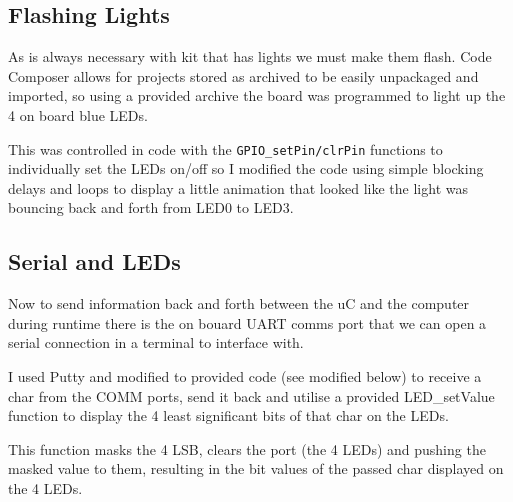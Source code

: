 \documentclass[11pt]{article}
\begin{document}
\begin{preview}
    \subsection{Flashing Lights}
    As is always necessary with kit that has lights we must make them flash. Code Composer allows for projects stored as archived to be easily unpackaged and imported, so using a provided archive the board was programmed to light up the 4 on board blue LEDs.

    This was controlled in code with the \texttt{GPIO\_setPin/clrPin} functions to individually set the LEDs on/off so I modified the code using simple blocking delays and loops to display a little animation that looked like the light was bouncing back and forth from LED0 to LED3. 
        
    \subsection{Serial and LEDs}
    Now to send information back and forth between the uC and the computer during runtime there is the on bouard UART comms port that we can open a serial connection in a terminal to interface with.

    I used Putty and modified to provided code (see modified below) to receive a char from the COMM ports, send it back and utilise a provided LED\_setValue function to display the 4 least significant bits of that char on the LEDs.
    
    This function masks the 4 LSB, clears the port (the 4 LEDs) and pushing the masked value to them, resulting in the bit values of the passed char displayed on the 4 LEDs.
    

\end{preview}
\end{document}
